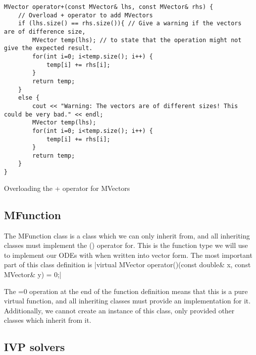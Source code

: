 \documentclass[a4paper,11pt]{report}
\begin{document}
\begin{listing}
\begin{verbatim}
MVector operator+(const MVector& lhs, const MVector& rhs) {
	// Overload + operator to add MVectors
	if (lhs.size() == rhs.size()){ // Give a warning if the vectors are of difference size,
		MVector temp(lhs); // to state that the operation might not give the expected result.
		for(int i=0; i<temp.size(); i++) {
			temp[i] += rhs[i];
		}
		return temp;
	}
	else {
		cout << "Warning: The vectors are of different sizes! This could be very bad." << endl;
		MVector temp(lhs);
		for(int i=0; i<temp.size(); i++) {
			temp[i] += rhs[i];
		}
		return temp;
	}
}
\end{verbatim}
\caption{Overloading the + operator for MVectors}
\label{lst:plusover}
\end{listing}

\subsection{MFunction}

The MFunction class is a class which we can only inherit from, and all inheriting classes must implement the () operator for. This is the function type we will use to implement our ODEs with when written into vector form. The most important part of this class definition is
|virtual MVector operator()(const double& x, const MVector& y) = 0;|

The =0 operation at the end of the function definition means that this is a pure virtual function, and all inheriting classes must provide an implementation for it. Additionally, we cannot create an instance of this class, only provided other classes which inherit from it.

\subsection{IVP solvers}
\end{document}
